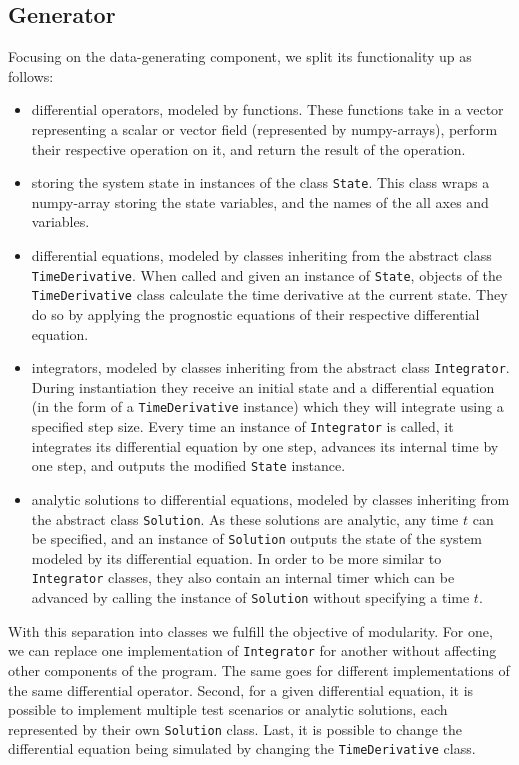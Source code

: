 \subsection*{Generator}
Focusing on the data-generating component, we split its functionality up as follows:
\begin{itemize}
\item differential operators, modeled by functions. 
These functions take in a vector representing a scalar or vector field (represented by numpy-arrays), perform their respective operation on it, and return the result of the operation.
\item storing the system state in instances of the class \texttt{State}.
This class wraps a numpy-array storing the state variables, and the names of the all axes and variables.
\item differential equations, modeled by classes inheriting from the abstract class \texttt{TimeDerivative}.
When called and given an instance of \texttt{State}, objects of the \texttt{TimeDerivative} class calculate the time derivative at the current state.
They do so by applying the prognostic equations of their respective differential equation.
\item integrators, modeled by classes inheriting from the abstract class \texttt{Integrator}.
During instantiation they receive an initial state and a differential equation (in the form of a \texttt{TimeDerivative} instance) which they will integrate using a specified step size.
Every time an instance of \texttt{Integrator} is called, it integrates its differential equation by one step, advances its internal time by one step, and outputs the modified \texttt{State} instance.
\item analytic solutions to differential equations, modeled by classes inheriting from the abstract class \texttt{Solution}.
As these solutions are analytic, any time $t$ can be specified, and an instance of \texttt{Solution} outputs the state of the system modeled by its differential equation.
In order to be more similar to \texttt{Integrator} classes, they also contain an internal timer which can be advanced by calling the instance of \texttt{Solution} without specifying a time $t$.
\end{itemize}
With this separation into classes we fulfill the objective of modularity.
For one, we can replace one implementation of \texttt{Integrator} for another without affecting other components of the program.
The same goes for different implementations of the same differential operator.
Second, for a given differential equation, it is possible to implement multiple test scenarios or analytic solutions, each represented by their own \texttt{Solution} class.
Last, it is possible to change the differential equation being simulated by changing the \texttt{TimeDerivative} class.

